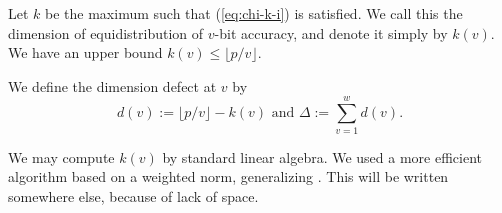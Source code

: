 \documentclass{svmult}
\begin{document}


\begin{definition}\label{def:virtual}
Let $k$ be the maximum such that
(\ref{eq:chi-k-i}) is satisfied. We call this
the dimension of equidistribution
of $v$-bit accuracy, and denote it simply by $k(v)$.
We have an upper bound $k(v) \leq \lfloor p/v \rfloor$.

We define the dimension defect at $v$
by
$$
d(v):=\lfloor p/v \rfloor - k(v) 
\mbox{ and } \Delta:=\sum_{v=1}^w d(v).
$$
\end{definition}
We may compute $k(v)$ by standard linear algebra.
We used a more efficient algorithm based on 
a weighted norm,
generalizing \cite{CLT}. This will be written 
somewhere else,
because of lack of space.
\end{document}

